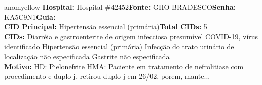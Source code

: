 \documentclass[a4paper,10pt]{article}
\begin{document}
\begin{anomalycard}[Interna\c{c}\~{a}o \#120129 | Pac. \#96506 | MODERADO (z=2.12) | LOS: 3d | 06/03/2026\,$\to$\,09/03/2026]{anomyellow}
\textbf{Hospital:} Hospital \#42452\quad \textbf{Fonte:} GHO-BRADESCO\quad \textbf{Senha:} KA5C9N1\quad \textbf{Guia:} ---\\

\textbf{CID Principal:} {\small Hipertensão essencial (primária)}\quad\textbf{Total CIDs:} 5\\

\textbf{CIDs:} {\scriptsize Diarréia e gastroenterite de origem infecciosa presumível \textbar{} COVID-19, vírus identificado \textbar{} Hipertensão essencial (primária) \textbar{} Infecção do trato urinário de localização não especificada \textbar{} Gastrite não especificada}\\

\textbf{Motivo:} {\scriptsize HD: Pielonefrite  HMA: Paciente em tratamento de nefrolitiase com procedimento e duplo j, retirou duplo j em 26/02, porem, mante...}\\




\end{anomalycard}
\end{document}
